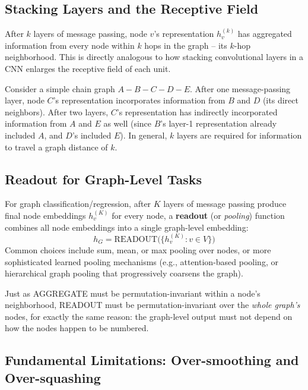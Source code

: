 \documentclass[12pt,a4paper]{article}
\begin{document}
\subsection{Stacking Layers and the Receptive Field}

After $k$ layers of message passing, node $v$'s representation $h_v^{(k)}$ has aggregated information from every node within $k$ hops in the graph -- its $k$-hop neighborhood. This is directly analogous to how stacking convolutional layers in a CNN enlarges the receptive field of each unit.

\begin{example}
Consider a simple chain graph $A - B - C - D - E$. After one message-passing layer, node $C$'s representation incorporates information from $B$ and $D$ (its direct neighbors). After two layers, $C$'s representation has indirectly incorporated information from $A$ and $E$ as well (since $B$'s layer-1 representation already included $A$, and $D$'s included $E$). In general, $k$ layers are required for information to travel a graph distance of $k$.
\end{example}

\subsection{Readout for Graph-Level Tasks}

For graph classification/regression, after $K$ layers of message passing produce final node embeddings $h_v^{(K)}$ for every node, a \textbf{readout} (or \emph{pooling}) function combines all node embeddings into a single graph-level embedding:
\[
h_G = \text{READOUT}\big(\{h_v^{(K)} : v \in V\}\big)
\]
Common choices include sum, mean, or max pooling over nodes, or more sophisticated learned pooling mechanisms (e.g., attention-based pooling, or hierarchical graph pooling that progressively coarsens the graph).

\begin{keyidea}
Just as AGGREGATE must be permutation-invariant within a node's neighborhood, READOUT must be permutation-invariant over the \emph{whole graph's} nodes, for exactly the same reason: the graph-level output must not depend on how the nodes happen to be numbered.
\end{keyidea}

\subsection{Fundamental Limitations: Over-smoothing and Over-squashing}
\end{document}
